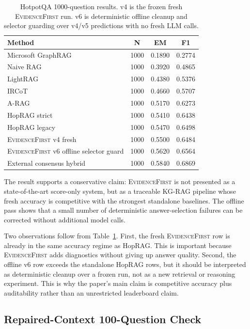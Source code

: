 \documentclass[runningheads]{llncs}
\newcommand{\sys}{\textsc{EvidenceFirst}\xspace}
\begin{document}
\begin{table}[t]
\centering
\caption{HotpotQA 1000-question results. v4 is the frozen fresh \sys run.
v6 is deterministic offline cleanup and selector guarding over v4/v5
predictions with no fresh LLM calls.}
\label{tab:main_results}
\begin{tabular}{lccc}
\toprule
Method & N & EM & F1 \\
\midrule
Microsoft GraphRAG & 1000 & 0.1890 & 0.2774 \\
Naive RAG & 1000 & 0.3920 & 0.4865 \\
LightRAG & 1000 & 0.4380 & 0.5376 \\
IRCoT & 1000 & 0.4660 & 0.5707 \\
A-RAG & 1000 & 0.5170 & 0.6273 \\
HopRAG strict & 1000 & 0.5410 & 0.6438 \\
HopRAG legacy & 1000 & 0.5470 & 0.6498 \\
\midrule
\sys v4 fresh & 1000 & 0.5500 & 0.6484 \\
\sys v6 offline selector guard & 1000 & 0.5620 & 0.6564 \\
\midrule
External consensus hybrid & 1000 & 0.5840 & 0.6869 \\
\bottomrule
\end{tabular}
\end{table}

The result supports a conservative claim: \sys is not presented as a
state-of-the-art score-only system, but as a traceable KG-RAG pipeline whose
fresh accuracy is competitive with the strongest standalone baselines. The
offline pass shows that a small number of deterministic answer-selection
failures can be corrected without additional model calls.

Two observations follow from Table~\ref{tab:main_results}. First, the fresh
\sys row is already in the same accuracy regime as HopRAG. This is important
because \sys adds diagnostics without giving up answer quality. Second, the
offline v6 row exceeds the standalone HopRAG rows, but it should be interpreted
as deterministic cleanup over a frozen run, not as a new retrieval or reasoning
experiment. This is why the paper's main claim is competitive accuracy plus
auditability rather than an unrestricted leaderboard claim.

\subsection{Repaired-Context 100-Question Check}
\end{document}
